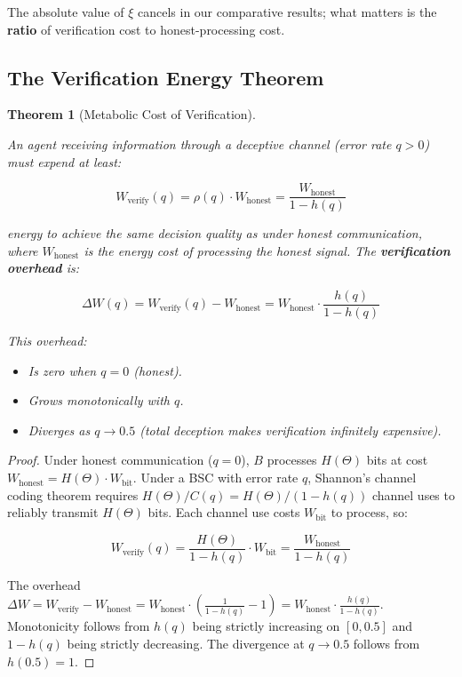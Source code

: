 \documentclass[11pt]{article}
\theoremstyle{plain}
\newtheorem{theorem}{Theorem}
\theoremstyle{definition}
\theoremstyle{remark}
\let\origsubsection\subsection
\renewcommand{\subsection}{\needspace{7\baselineskip}\origsubsection}
\begin{document}
The absolute value of \(\xi\) cancels in our comparative results; what
matters is the \textbf{ratio} of verification cost to honest-processing
cost.

\subsection{The Verification Energy
Theorem}\label{the-verification-energy-theorem}

\begin{theorem}[Metabolic Cost of Verification]
\label{thm-metabolic-cost-verification}

An agent receiving information through a deceptive channel (error rate $q > 0$) must expend at least:

$$W_{\text{verify}}(q) = \rho(q) \cdot W_{\text{honest}} = \frac{W_{\text{honest}}}{1 - h(q)}$$

energy to achieve the same decision quality as under honest communication, where $W_{\text{honest}}$ is the energy cost of processing the honest signal. The \textbf{verification overhead} is:

$$\Delta W(q) = W_{\text{verify}}(q) - W_{\text{honest}} = W_{\text{honest}} \cdot \frac{h(q)}{1 - h(q)}$$

This overhead:
\begin{itemize}
\item Is zero when $q = 0$ (honest).
\item Grows monotonically with $q$.
\item Diverges as $q \to 0.5$ (total deception makes verification infinitely expensive).
\end{itemize}

\end{theorem}

\begin{proof}
Under honest communication ($q = 0$), $B$ processes $H(\Theta)$ bits at cost $W_{\text{honest}} = H(\Theta) \cdot W_{\text{bit}}$. Under a BSC with error rate $q$, Shannon's channel coding theorem requires $H(\Theta) / C(q) = H(\Theta) / (1 - h(q))$ channel uses to reliably transmit $H(\Theta)$ bits. Each channel use costs $W_{\text{bit}}$ to process, so:

$$W_{\text{verify}}(q) = \frac{H(\Theta)}{1 - h(q)} \cdot W_{\text{bit}} = \frac{W_{\text{honest}}}{1 - h(q)}$$

The overhead $\Delta W = W_{\text{verify}} - W_{\text{honest}} = W_{\text{honest}} \cdot \left(\frac{1}{1-h(q)} - 1\right) = W_{\text{honest}} \cdot \frac{h(q)}{1-h(q)}$. Monotonicity follows from $h(q)$ being strictly increasing on $[0, 0.5]$ and $1 - h(q)$ being strictly decreasing. The divergence at $q \to 0.5$ follows from $h(0.5) = 1$.
\end{proof}
\end{document}

